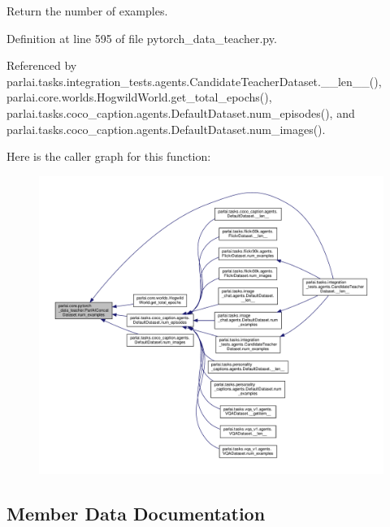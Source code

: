 \begin{DoxyVerb}Return the number of examples.\end{DoxyVerb}
 

Definition at line 595 of file pytorch\+\_\+data\+\_\+teacher.\+py.



Referenced by parlai.\+tasks.\+integration\+\_\+tests.\+agents.\+Candidate\+Teacher\+Dataset.\+\_\+\+\_\+len\+\_\+\+\_\+(), parlai.\+core.\+worlds.\+Hogwild\+World.\+get\+\_\+total\+\_\+epochs(), parlai.\+tasks.\+coco\+\_\+caption.\+agents.\+Default\+Dataset.\+num\+\_\+episodes(), and parlai.\+tasks.\+coco\+\_\+caption.\+agents.\+Default\+Dataset.\+num\+\_\+images().

Here is the caller graph for this function\+:
\nopagebreak
\begin{figure}[H]
\begin{center}
\leavevmode
\includegraphics[width=350pt]{classparlai_1_1core_1_1pytorch__data__teacher_1_1ParlAIConcatDataset_a18b104ac4b013780a973cf8655b8406a_icgraph}
\end{center}
\end{figure}


\subsection{Member Data Documentation}
\mbox{\label{classparlai_1_1core_1_1pytorch__data__teacher_1_1ParlAIConcatDataset_a431fa0b54c4f0d63911c8bcaf73b8ffc}} 
